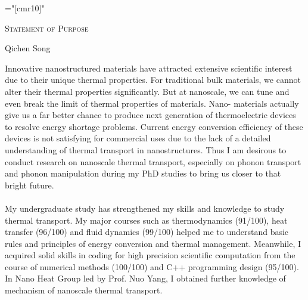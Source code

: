 \documentclass[a4paper,10pt]{article}
\begin{document}
\thispagestyle {fancy}
\pagestyle{fancy}
\fancyfoot{}%
\begin{spacing}{1.5}
{}
{}



\font\fb="[cmr10]" %
\begin{center} {  \vspace{5em}  }  \end{center}
\begin{center} {\par\LARGE{\textsc{Statement of Purpose}}}  \end{center}%
\vspace{0.0em}
\begin{center} {\large {Qichen Song}     }  \end{center}
\vspace{2.0em}
Innovative nanostructured materials have attracted extensive scientific interest due to their unique thermal properties. For traditional bulk materials, we cannot alter their thermal properties significantly. But at nanoscale, we can tune and even break the limit of thermal properties of materials. Nano- materials actually give us a far better chance to produce next generation of thermoelectric devices to resolve energy shortage problems. Current energy conversion efficiency of these devices is not satisfying for commercial uses due to the lack of a detailed understanding of thermal transport in nanostructures. Thus I am desirous to conduct research on nanoscale thermal transport, especially on phonon transport and phonon manipulation during my PhD studies to bring us closer to that bright future.\\
\\
My undergraduate study has strengthened my skills and knowledge to study thermal transport. My major courses such as thermodynamics (91/100), heat transfer (96/100) and fluid dynamics (99/100) helped me to understand basic rules and principles of energy conversion and thermal management. Meanwhile, I acquired solid skills in coding for high precision scientific computation from the course of numerical methods (100/100) and C++ programming design (95/100). In Nano Heat Group led by Prof. Nuo Yang, I obtained further knowledge of mechanism of nanoscale thermal transport.\\

\end{spacing}
\end{document}
